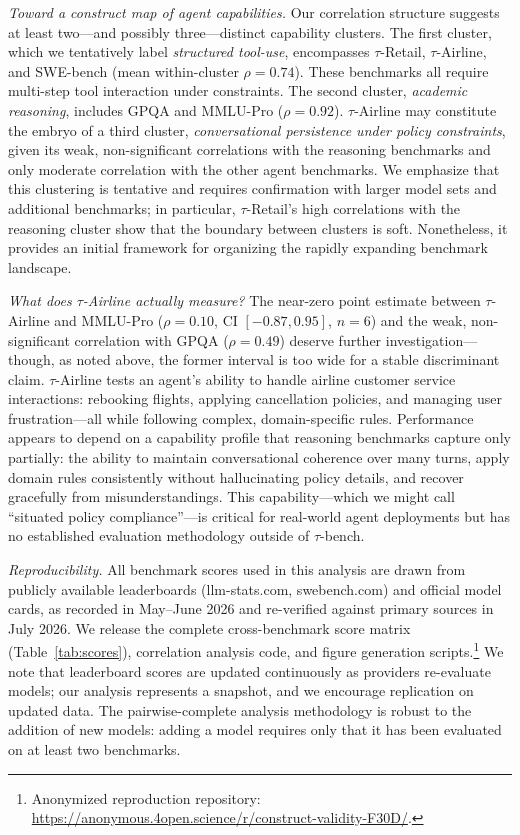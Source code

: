 \documentclass[11pt]{article}
\begin{document}
\textit{Toward a construct map of agent capabilities.} Our correlation structure suggests at least two---and possibly three---distinct capability clusters. The first cluster, which we tentatively label \emph{structured tool-use}, encompasses $\tau$-Retail, $\tau$-Airline, and SWE-bench (mean within-cluster $\rho = 0.74$). These benchmarks all require multi-step tool interaction under constraints. The second cluster, \emph{academic reasoning}, includes GPQA and MMLU-Pro ($\rho = 0.92$). $\tau$-Airline may constitute the embryo of a third cluster, \emph{conversational persistence under policy constraints}, given its weak, non-significant correlations with the reasoning benchmarks and only moderate correlation with the other agent benchmarks. We emphasize that this clustering is tentative and requires confirmation with larger model sets and additional benchmarks; in particular, $\tau$-Retail's high correlations with the reasoning cluster show that the boundary between clusters is soft. Nonetheless, it provides an initial framework for organizing the rapidly expanding benchmark landscape.

\textit{What does $\tau$-Airline actually measure?} The near-zero point estimate between $\tau$-Airline and MMLU-Pro ($\rho = 0.10$, CI $[-0.87, 0.95]$, $n = 6$) and the weak, non-significant correlation with GPQA ($\rho = 0.49$) deserve further investigation---though, as noted above, the former interval is too wide for a stable discriminant claim. $\tau$-Airline tests an agent's ability to handle airline customer service interactions: rebooking flights, applying cancellation policies, and managing user frustration---all while following complex, domain-specific rules. Performance appears to depend on a capability profile that reasoning benchmarks capture only partially: the ability to maintain conversational coherence over many turns, apply domain rules consistently without hallucinating policy details, and recover gracefully from misunderstandings. This capability---which we might call ``situated policy compliance''---is critical for real-world agent deployments but has no established evaluation methodology outside of $\tau$-bench.

{\sloppy
\textit{Reproducibility.} All benchmark scores used in this analysis are drawn from publicly available leaderboards (llm-stats.com, swebench.com) and official model cards, as recorded in May--June 2026 and re-verified against primary sources in July 2026. We release the complete cross-benchmark score matrix (Table~\ref{tab:scores}), correlation analysis code, and figure generation scripts.\footnote{Anonymized reproduction repository: \url{https://anonymous.4open.science/r/construct-validity-F30D/}.} We note that leaderboard scores are updated continuously as providers re-evaluate models; our analysis represents a snapshot, and we encourage replication on updated data. The pairwise-complete analysis methodology is robust to the addition of new models: adding a model requires only that it has been evaluated on at least two benchmarks.\par}
\end{document}
